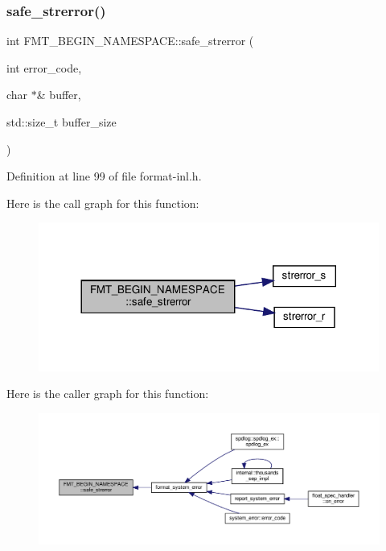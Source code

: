 \subsubsection{\texorpdfstring{safe\+\_\+strerror()}{safe\_strerror()}}
{\footnotesize\ttfamily int F\+M\+T\+\_\+\+B\+E\+G\+I\+N\+\_\+\+N\+A\+M\+E\+S\+P\+A\+C\+E\+::safe\+\_\+strerror (\begin{DoxyParamCaption}\item[{int}]{error\+\_\+code,  }\item[{char $\ast$\&}]{buffer,  }\item[{std\+::size\+\_\+t}]{buffer\+\_\+size }\end{DoxyParamCaption})}



Definition at line 99 of file format-\/inl.\+h.

Here is the call graph for this function\+:
\nopagebreak
\begin{figure}[H]
\begin{center}
\leavevmode
\includegraphics[width=317pt]{namespace_f_m_t___b_e_g_i_n___n_a_m_e_s_p_a_c_e_a3770dc340d58166b701180e092935e12_cgraph}
\end{center}
\end{figure}
Here is the caller graph for this function\+:
\nopagebreak
\begin{figure}[H]
\begin{center}
\leavevmode
\includegraphics[width=350pt]{namespace_f_m_t___b_e_g_i_n___n_a_m_e_s_p_a_c_e_a3770dc340d58166b701180e092935e12_icgraph}
\end{center}
\end{figure}
